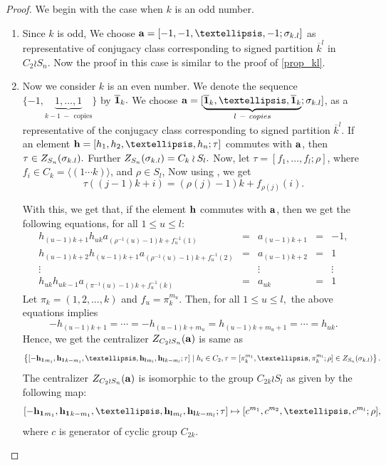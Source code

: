 \documentclass[12pt,twoside,reqno]{amsart}
\theoremstyle{definition}
\numberwithin{equation}{section}
\begin{document}
\begin{proof}
We begin with the case when $k$ is an odd number.
\begin{enumerate}
    \item Since $k$ is odd, We choose ${\bf a} =[-1,-1,\ldots, -1 ; {\bf \sigma}_{k.l}]$ as representative of conjugacy class  corresponding to signed partition $\overline{k}^l$ in $C_2 \wr S_n.$
    Now the proof in this case is similar to the proof of \ref{prop_kl}.
    \item Now we consider $k$ is an even number. We denote the sequence $\{ -1,\underbrace{1, \ldots, 1}_{k-1~-~~\mathrm{copies}}\}$ by $\overline{\bf 1}_k.$  We choose ${\bf a} = [ \underbrace{\overline{{\bf 1}}_k,\ldots, \overline{{\bf 1}}_k}_{l~-~copies}; {\bf \sigma}_{k.l}]$, as a representative of the conjugacy class corresponding to signed partition $\overline{k}^l.$ If an element ${\bf h}= [h_1, h_2, \ldots, h_n ; \tau]$ commutes with ${\bf a}$, then $\tau \in Z_{S_n}({\bf \sigma}_{k.l}).$ Further $Z_{S_n}({\bf \sigma}_{k.l}) = C_k\wr S_l.$ Now, let $\tau = [f_1,\ldots, f_l;\rho]$, where $f_i \in C_k = \langle (1\cdots k)\rangle$, and $\rho \in S_l$, Now using \cite[Equation 4.1.19]{JK}, we get 
    \begin{equation}\label{equation_action}
          \tau((j-1)k + i) = (\rho(j)-1)k + f_{\rho(j)}(i).
    \end{equation}
  
    With this, we get that, if the element ${\bf h}$ commutes with ${\bf a}$, then we get the following equations, for all $1\leq u \leq l$:
 $$   \begin{smallmatrix}
h_{(u-1)k+1}h_{uk}a_{(\rho^{-1}(u)-1)k+f^{-1}_{u}(1)}&=& a_{(u-1)k+1} &=& -1,\\
h_{(u-1)k+2}h_{(u-1)k+1}a_{(\rho^{-1}(u)-1)k+f^{-1}_{u}(2)}&=& a_{(u-1)k+2}& =& 1\\
\vdots &~& \vdots &~& \vdots \\
h_{uk}h_{uk-1}a_{(\pi^{-1}(u)-1)k+f^{-1}_{u}(k)}&=& a_{uk} &=& 1
\end{smallmatrix}
$$
Let $\pi_k=(1,2,\dots,k)$ and $f_u = \pi_k^{m_u}.$ Then, for all $1\leq u \leq l, $ the above equations implies 
 $$-h_{(u-1)k+1} = \cdots = -h_{(u-1)k+m_u}= h_{(u-1)k+m_u+1} = \cdots = h_{uk}.$$ Hence, we get 
the centralizer $Z_{C_2 \wr S_n}({\bf a})$ is same as  $$\left\{ 
[-{\bf h_1}_{m_1}, {\bf h_1}_{k-m_1},\ldots,{\bf h_l}_{m_l}, {\bf h_l}_{k-m_l}; \tau]\mid  h_i \in C_2, \tau =[\pi_k^{m_1},\ldots,\pi_k^{m_l};\rho]\in Z_{S_n}({\bf \sigma}_{k.l})\right\}.$$ 
The centralizer $Z_{C_2 \wr S_n}({\bf a})$  is isomorphic to the group $C_{2k}\wr S_l$ as given by the following map:
$$[-{\bf h_1}_{m_1}, {\bf h_1}_{k-m_1},\ldots,{\bf h_l}_{m_l}, {\bf h_l}_{k-m_l}; \tau] \mapsto [c^{m_1}, c^{m_2}, \dots, c^{m_l}; \rho ],
$$
where $c$ is generator of cyclic group $C_{2k}.$ 
    \end{enumerate}
\end{proof}
\end{document}
